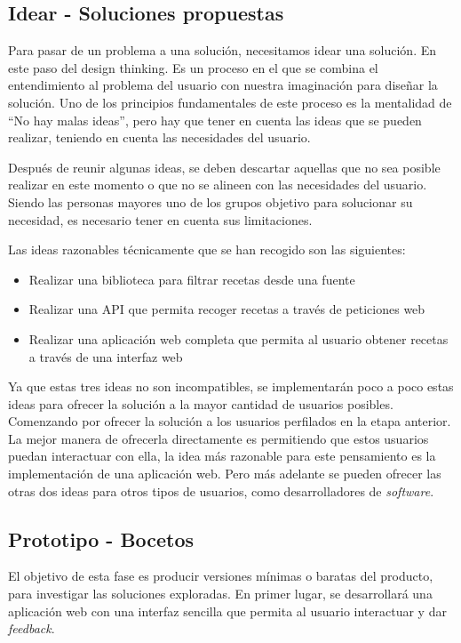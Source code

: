 \begin{enumerate}
\subsection{Idear - Soluciones propuestas}
Para pasar de un problema a una solución, necesitamos idear una solución. En este paso del design thinking. Es un proceso en el que se combina el entendimiento al problema del usuario con nuestra imaginación para diseñar la solución. Uno de los principios fundamentales de este proceso es la mentalidad de ``No hay malas ideas'', pero hay que tener en cuenta las ideas que se pueden realizar, teniendo en cuenta las necesidades del usuario. \cite{idear2023}

Después de reunir algunas ideas, se deben descartar aquellas que no sea posible realizar en este momento o que no se alineen con las necesidades del usuario. Siendo las personas mayores uno de los grupos objetivo para solucionar su necesidad, es necesario tener en cuenta sus limitaciones.

Las ideas razonables técnicamente que se han recogido son las siguientes: 
\begin{itemize}
    \item Realizar una biblioteca para filtrar recetas desde una fuente
    \item Realizar una \gls{API} que permita recoger recetas a través de peticiones web
    \item Realizar una aplicación web completa que permita al usuario obtener recetas a través de una interfaz web
\end{itemize}

Ya que estas tres ideas no son incompatibles, se implementarán poco a poco estas ideas para ofrecer la solución a la mayor cantidad de usuarios posibles. Comenzando por ofrecer la solución a los usuarios perfilados en la etapa anterior. La mejor manera de ofrecerla directamente es permitiendo que estos usuarios puedan interactuar con ella, la idea más razonable para este pensamiento es la implementación de una aplicación web. Pero más adelante se pueden ofrecer las otras dos ideas para otros tipos de usuarios, como desarrolladores de \emph{software}.

\subsection{Prototipo - Bocetos}
El objetivo de esta fase es producir versiones mínimas o baratas del producto, para investigar las soluciones exploradas. En primer lugar, se desarrollará una aplicación web con una interfaz sencilla que permita al usuario interactuar y dar \textit{feedback}.


\end{enumerate}
